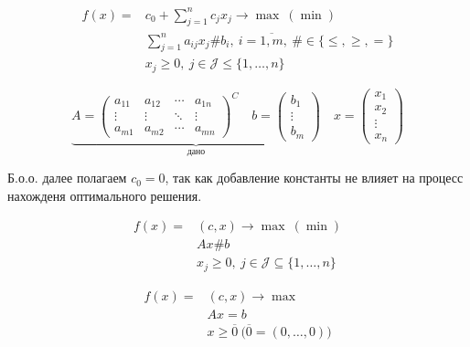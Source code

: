 \begin{definition}
	\[
		\begin{array}{ll}
			f(x) = & c_0 + \sum_{j=1}^{n} c_jx_j \rightarrow \max \ (\min)                                         \\
			       & \sum_{j=1}^{n} a_{ij} x_j \# b_i, \ i = \overline{1,m} , \ \# \in \{\leqslant ,\geqslant ,=\} \\
			       & x_j \geqslant 0, \ j \in \mathcal{J} \leqslant \{1,\ldots ,n\}
		\end{array}
	\]

	\[
		\underbrace{A = \left(\begin{array}{cccc}
				a_{11} & a_{12} & \cdots & a_{1n} \\
				\vdots & \vdots & \ddots & \vdots \\
				a_{m1} & a_{m2} & \cdots & a_{mn}
			\end{array}\right)^C \quad b = \left(\begin{array}{c}
				b_1 \\ \vdots \\ b_m
			\end{array}\right)}_{\text{дано}} \quad x = \left(\begin{array}{c}
				x_1 \\ x_2 \\ \vdots \\ x_n
			\end{array}\right)
	\]
\end{definition}

\begin{remark}
	Б.о.о. далее полагаем $c_0 = 0$, так как добавление константы не влияет на процесс нахожденя оптимального решения.
\end{remark}

\begin{note}
	\[
		\begin{array}{ll}
			f(x) = & (c,x) \rightarrow \max \ (\min)                                \\
			       & Ax \# b                                                        \\
			       & x_j \geqslant 0, \ j \in \mathcal{J} \subseteq \{1,\ldots ,n\}
		\end{array}
	\]
\end{note}

\begin{note}
	\[
		\begin{array}{ll}
			f(x) = & (c,x) \rightarrow \max                                             \\
			       & Ax = b                                                             \\
			       & x \geqslant \overline{0} \ \big(\overline{0}  = (0,\ldots ,0)\big)
		\end{array}
	\]
\end{note}

